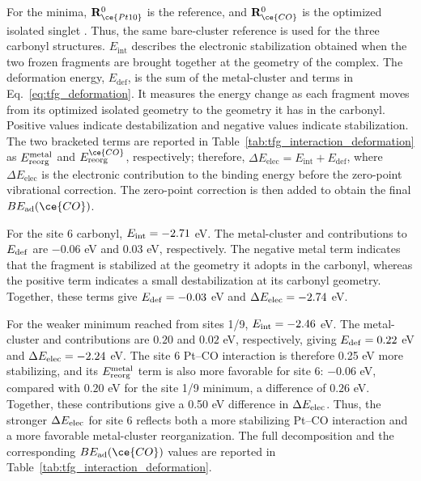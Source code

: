 For the  minima,
\(\mathbf R_{\ce{Pt10}}^0\) is the
 reference, and
\(\mathbf R_{\ce{CO}}^0\) is the optimized isolated singlet . Thus, the
same bare-cluster reference is used for the three carbonyl structures.
$E_{\mathrm{int}}$ describes the electronic stabilization obtained when
the two frozen fragments are brought together at the geometry of the complex.
The deformation energy, $E_{\mathrm{def}}$, is the sum of the
metal-cluster and  terms in Eq.~\ref{eq:tfg_deformation}. It measures
the energy change as each fragment moves from its optimized isolated
geometry to the geometry it has in the carbonyl. Positive values indicate
destabilization
and negative values indicate stabilization.
The two bracketed terms are reported in
Table~\ref{tab:tfg_interaction_deformation} as
$E_{\rm reorg}^{\rm metal}$ and $E_{\rm reorg}^{\ce{CO}}$, respectively;
therefore,
$\Delta E_{\mathrm{elec}}=E_{\mathrm{int}}+E_{\mathrm{def}}$, where
$\Delta E_{\mathrm{elec}}$ is the electronic contribution to the binding
energy before the zero-point vibrational correction. The zero-point correction
is then added to obtain the final $BE_{\rm ad}(\ce{CO})$.


For the site 6 carbonyl, \(E_{\rm int}=-2.71\) eV. The
metal-cluster and  contributions to \(E_{\rm def}\) are \(-0.06\) eV
and \(0.03\) eV, respectively. The negative metal term indicates that the
 fragment is stabilized at the geometry it adopts in the carbonyl,
whereas the positive  term indicates a small destabilization at its
carbonyl geometry. Together, these terms give \(E_{\rm def}=-0.03\) eV and
\(\Delta E_{\rm elec}=-2.74\) eV.

For the weaker minimum reached from sites 1/9, \(E_{\rm int}=-2.46\) eV. The
metal-cluster and  contributions are \(0.20\) and \(0.02\) eV,
respectively, giving \(E_{\rm def}=0.22\) eV and
\(\Delta E_{\rm elec}=-2.24\) eV. 
The site 6 Pt--CO interaction is therefore
0.25 eV more stabilizing, and its $E_{\rm reorg}^{\rm metal}$ 
term is also more favorable for site 6: \(-0.06\) eV, compared with \(0.20\) eV
for the site 1/9 minimum, a difference of \(0.26\) eV.
Together, these contributions give a 0.50 eV difference in
\(\Delta E_{\rm elec}\). Thus, the stronger \(\Delta E_{\rm elec}\) for site 6 reflects both a more stabilizing Pt–CO interaction and a more favorable metal-cluster reorganization.
The full decomposition and the corresponding
\(BE_{\rm ad}(\ce{CO})\) values are reported in
Table~\ref{tab:tfg_interaction_deformation}.


